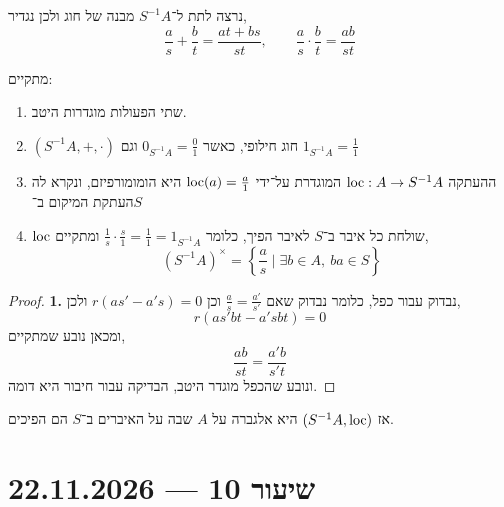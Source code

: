 נרצה לתת ל־$S^{-1} A$ מבנה של חוג ולכן נגדיר,
\[
	\frac{a}{s} + \frac{b}{t}
	= \frac{a t + b s}{s t},
	\qquad
	\frac{a}{s} \cdot \frac{b}{t}
	= \frac{a b}{s t}
\]
\begin{proposition}
	מתקיים:
	\begin{enumerate}
		\item שתי הפעולות מוגדרות היטב.
		\item $(S^{-1} A, +, \cdot)$ חוג חילופי, כאשר $0_{S^{-1} A} = \frac{0}{1}$ וגם $1_{S^{-1} A} = \frac{1}{1}$
		\item ההעתקה $\operatorname{loc} : A \to S^{-1} A$ המוגדרת על־ידי $\operatorname{loc}(a) = \frac{a}{1}$ היא הומומורפיזם, ונקרא לה העתקת המיקום ב־$S$
		\item $\operatorname{loc}$ שולחת כל איבר ב־$S$ לאיבר הפיך, כלומר $\frac{1}{s} \cdot \frac{s}{1} = \frac{1}{1} = 1_{S^{-1} A}$ ומתקיים,
			\[
				{(S^{-1} A)}^\times
				= \left\{ \frac{a}{s} \mid \exists b \in A,\ b a \in S \right\}
			\]
	\end{enumerate}
\end{proposition}
\begin{proof}
	\textbf{1.}
	נבדוק עבור כפל, כלומר נבדוק שאם $\frac{a}{s} = \frac{a'}{s'}$ וכן $r(a s' - a' s) = 0$ ולכן,
	\[
		r (a s' b t - a' s b t) = 0
	\]
	ומכאן נובע שמתקיים,
	\[
		\frac{a b}{s t}
		= \frac{a' b}{s' t}
	\]
	ונובע שהכפל מוגדר היטב, הבדיקה עבור חיבור היא דומה.
\end{proof}
אז $(S^{-1} A, \operatorname{loc})$ היא אלגברה על $A$ שבה על האיברים ב־$S$ הם הפיכים.

\section{שיעור 10 --- 22.11.2026}
